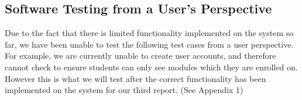 \subsection*{Software Testing from a User's Perspective}

Due to the fact that there is limited functionality implemented on the system so far, we have been unable to test the following test cases from a user perspective. For example, we are currently unable to create user accounts, and therefore cannot check to ensure students can only see modules which they are enrolled on.\\

However this is what we will test after the correct functionality has been implemented on the system for our third report. (See Appendix 1)\\